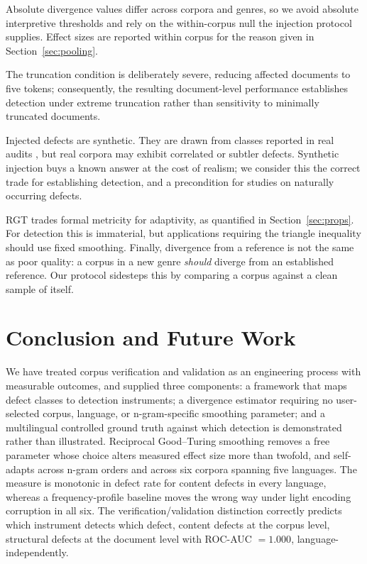 \documentclass[conference]{IEEEtran}
\begin{document}
Absolute divergence values differ across corpora and genres, so we avoid absolute
interpretive thresholds and rely on the within-corpus null the injection protocol
supplies. Effect sizes are reported within corpus for the reason given in
Section~\ref{sec:pooling}.

The truncation condition is deliberately severe, reducing affected documents to five tokens; consequently, the resulting document-level performance establishes detection under extreme truncation rather than sensitivity to minimally truncated documents.

Injected defects are synthetic. They are drawn from classes reported in real
audits \cite{kreutzer2022,dodge2021}, but real corpora may exhibit correlated or
subtler defects. Synthetic injection buys a known answer at the cost of realism;
we consider this the correct trade for establishing detection, and a precondition
for studies on naturally occurring defects.

RGT trades formal metricity for adaptivity, as quantified in
Section~\ref{sec:props}. For detection this is immaterial, but applications
requiring the triangle inequality should use fixed smoothing. Finally, divergence
from a reference is not the same as poor quality: a corpus in a new genre
\emph{should} diverge from an established reference. Our protocol sidesteps this
by comparing a corpus against a clean sample of itself.

\section{Conclusion and Future Work}

We have treated corpus verification and validation as an engineering process with
measurable outcomes, and supplied three components: a framework that maps defect
classes to detection instruments; a divergence estimator requiring no user-selected corpus, language, or n-gram-specific smoothing parameter; and a
multilingual controlled ground truth against which detection is demonstrated
rather than illustrated. Reciprocal Good--Turing smoothing removes a free
parameter whose choice alters measured effect size more than twofold, and
self-adapts across n-gram orders and across six corpora spanning five languages.
The measure is monotonic in defect rate for content defects in every language,
whereas a frequency-profile baseline moves the wrong way under light encoding
corruption in all six. The verification/validation distinction correctly predicts
which instrument detects which defect, content defects at the corpus level,
structural defects at the document level with ROC-AUC $=1.000$, language-independently.
\end{document}
